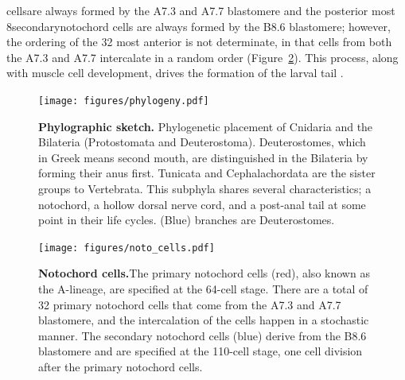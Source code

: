 cells\textemdash are always formed by the A7.3 and A7.7 blastomere and the posterior most 8\textemdash secondary\textemdash notochord cells are always formed by the B8.6 blastomere; however, the ordering of the 32 most anterior is not determinate, in that cells from both the A7.3 and A7.7 intercalate in a random order (Figure~\ref{fig:noto_cells})\cite{nishida_cell_1983,nishida_cell_1985,miyamoto_formation_1985, swalla_mechanisms_1993,kourakis_one-dimensional_2014}. This process, along with muscle cell development, drives the formation of the larval tail \cite{miyamoto_formation_1985, jeffery_factors_1992,swalla_mechanisms_1993}.
\begin{figure}[tbp]
\centering
\texttt{[image: figures/phylogeny.pdf]}

\caption{\textbf{Phylographic sketch.} Phylogenetic placement of Cnidaria and the Bilateria (Protostomata and Deuterostoma). Deuterostomes, which in Greek means second mouth, are distinguished in the Bilateria by forming their anus first. Tunicata and Cephalachordata are the sister groups to Vertebrata. This subphyla shares several characteristics; a notochord, a hollow dorsal nerve cord, and a post-anal tail at some point in their life cycles. (Blue) branches are Deuterostomes.}
\label{fig:phylog}
\end{figure}

\begin{figure}[thbp]
\centering
\texttt{[image: figures/noto\_cells.pdf]}
\caption{\textbf{Notochord cells.}The primary notochord cells (red), also known as the A-lineage, are specified at the 64-cell stage. There are a total of 32 primary notochord cells that come from the A7.3 and A7.7 blastomere, and the intercalation of the cells happen in a stochastic manner. The secondary notochord cells (blue) derive from the B8.6 blastomere and are specified at the 110-cell stage, one cell division after the primary notochord cells.}
\label{fig:noto_cells}
\end{figure}

